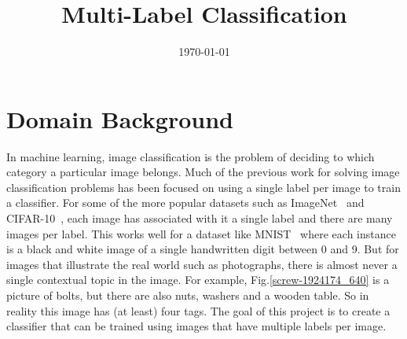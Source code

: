 \documentclass[10pt, a4paper, twocolumn]{article} %
\title{Multi-Label Classification} %
\author{
	\authorstyle{Willie Maddox} %
}
\date{\today} %
\begin{document}
\maketitle %

\thispagestyle{firstpage} %




\section{Domain Background}\label{sec:1} %


In machine learning, image classification is the problem of deciding to which category a particular image belongs. Much of the previous work for solving image classification problems has been focused on using a single label per image to train a classifier.  For some of the more popular datasets such as ImageNet~\citep{ILSVRC15} and CIFAR-10~\cite{Krizhevsky2009}, each image has associated with it a single label and there are many images per label. This works well for a dataset like MNIST~\cite{mnist} where each instance is a black and white image of a single handwritten digit  between 0 and 9.  But for images that illustrate the real world such as photographs, there is almost never a single contextual topic in the image. For example, Fig.\ref{screw-1924174_640} is a picture of bolts, but there are also nuts, washers and a wooden table.  So in reality this image has (at least) four tags.  The goal of this project is to create a classifier that can be trained using images that have multiple labels per image.
\end{document}
